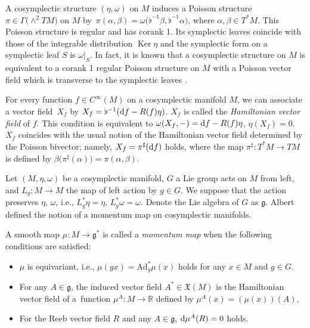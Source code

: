 \documentclass[10pt,a4paper]{amsart}
\numberwithin{equation}{section}
\begin{document}
A cosymplectic structure $(\eta,\omega)$ on $M$ induces a Poisson structure $\pi\in\Gamma\bigl(\wedge^2 TM\bigr)$ on $M$ by~$\pi(\alpha,\beta)=\omega\bigl(\flat^{-1}\beta,\flat^{-1}\alpha\bigr)$, where $\alpha,\beta\in T^\ast M$. This Poisson structure is regular and has corank 1. Its symplectic leaves coincide with those of the integrable distribution $\operatorname{Ker}\eta$ and the symplectic form on a symplectic leaf $S$ is $\omega|_S$. In fact, it is known that a cosymplectic structure on $M$ is equivalent to a corank 1 regular Poisson structure on $M$ with a Poisson vector field which is transverse to the symplectic leaves \cite{guillemin2011codimension}.


For every function $f\in C^\infty(M)$ on a cosymplectic manifold $M$, we can associate a vector field~$X_f$ by
$X_f=\flat^{-1}({\rm d}f-R(f)\eta)$.
$X_f$ is called the \textit{Hamiltonian vector field} of $f$. This condition is equivalent to
$\omega(X_f,-)={\rm d}f-R(f)\eta$, $\eta(X_f)=0$. $X_f$ coincides with the usual notion of the Hamiltonian vector field determined by the Poisson bivector; namely, $X_f=\pi^\sharp({\rm d}f)$ holds, where the map $\pi^\sharp\colon T^\ast M\to TM$ is defined by $\beta\bigl(\pi^\sharp(\alpha)\bigr)=\pi(\alpha,\beta)$.

Let $(M,\eta,\omega)$ be a cosymplectic manifold, $G$ a Lie group acts on $M$ from left, and $L_g\colon M\to M$ the map of left action by $g\in G$. We suppose that the action preserves $\eta$, $\omega$, i.e., $L_g^\ast \eta=\eta$, $ L_g^\ast \omega=\omega$. Denote the Lie algebra of $G$ as $\mathfrak{g}$. Albert \cite{albert1989theoreme} defined the notion of a momentum map on cosymplectic manifolds.

\begin{Definition}
 A smooth map $\mu\colon M\to\mathfrak{g}^\ast$ is called a \textit{momentum map} when the following conditions are satisfied:
 \begin{itemize}\itemsep=0pt
 \item $\mu$ is equivariant, i.e., $\mu(gx)=\textrm{Ad}^\ast_g\mu(x)$ holds for any $x\in M$ and $g\in G$.
 \item For any $A\in\mathfrak{g}$, the induced vector field $A^\ast\in\mathfrak{X}(M)$ is the Hamiltonian vector field of a~function $\mu^A\colon M\to\mathbb{R}$ defined by $\mu^A(x)=(\mu(x))(A)$,
 \item For the Reeb vector field $R$ and any $A\in\mathfrak{g}$, ${\rm d}\mu^A(R)=0$ holds.
 \end{itemize}
\end{Definition}
\end{document}
